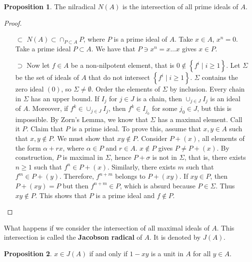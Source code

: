 \documentclass{article}
\newcommand{\rb}[1]{\left( #1 \right)}
\newcommand{\cb}[1]{\left\{ #1 \right\}}
\theoremstyle{definition}\newtheorem{definition}{Definition}[section]
\theoremstyle{definition}\newtheorem{remark}[definition]{Remark}
\theoremstyle{definition}\newtheorem*{example}{Example}
\theoremstyle{definition}\newtheorem*{note}{Note}
\newtheorem{proposition}[definition]{Proposition}
\begin{document}
\begin{proposition}
The nilradical $ N\rb{A} $ is the intersection of all prime ideals of $ A $.
\end{proposition}

\begin{proof}
\hfill
\begin{itemize}
\item[$ \subset $] $ N\rb{A} \subset \cap_{P \subset A} P $, where $ P $ is a prime ideal of $ A $. Take $ x \in A $, $ x^n = 0 $. Take a prime ideal $ P \subset A $. We have that $ P \ni x^n = x \dots x $ gives $ x \in P $.
\item[$ \supset $] Now let $ f \in A $ be a non-nilpotent element, that is $ 0 \notin \cb{f^i \mid i \ge 1} $. Let $ \Sigma $ be the set of ideals of $ A $ that do not intersect $ \cb{f^i \mid i \ge 1} $. $ \Sigma $ contains the zero ideal $ \rb{0} $, so $ \Sigma \ne \emptyset $. Order the elements of $ \Sigma $ by inclusion. Every chain in $ \Sigma $ has an upper bound. If $ I_j $ for $ j \in J $ is a chain, then $ \cup_{j \in J} I_j $ is an ideal of $ A $. Moreover, if $ f^k \in \cup_{j \in J} I_j $, then $ f^k \in I_{j_0} $ for some $ j_0 \in J $, but this is impossible. By Zorn's Lemma, we know that $ \Sigma $ has a maximal element. Call it $ P $. Claim that $ P $ is a prime ideal. To prove this, assume that $ x, y \in A $ such that $ x, y \notin P $. We must show that $ xy \notin P $. Consider $ P + \rb{x} $, all elements of the form $ \alpha + rx $, where $ \alpha \in P $ and $ r \in A $. $ x \notin P $ gives $ P \ne P + \rb{x} $. By construction, $ P $ is maximal in $ \Sigma $, hence $ P + \sigma $ is not in $ \Sigma $, that is, there exists $ n \ge 1 $ such that $ f^n \in P + \rb{x} $. Similarly, there exists $ m $ such that $ f^m \in P + \rb{y} $. Therefore, $ f^{n + m} $ belongs to $ P + \rb{xy} $. If $ xy \in P $, then $ P + \rb{xy} = P $ but then $ f^{n + m} \in P $, which is absurd because $ P \in \Sigma $. Thus $ xy \notin P $. This shows that $ P $ is a prime ideal and $ f \notin P $.
\end{itemize}
\end{proof}

What happens if we consider the intersection of all maximal ideals of $ A $. This intersection is called the \textbf{Jacobson radical} of $ A $. It is denoted by $ J\rb{A} $.

\begin{proposition}
\label{prop:5.3}
$ x \in J\rb{A} $ if and only if $ 1 - xy $ is a unit in $ A $ for all $ y \in A $.
\end{proposition}
\end{document}
